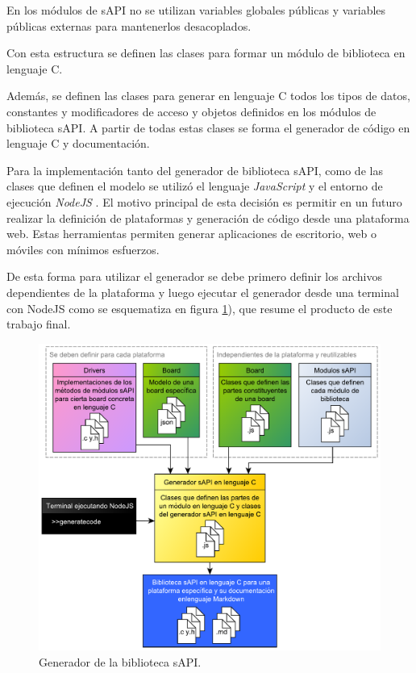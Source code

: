 En los módulos de sAPI no se utilizan variables globales públicas y variables públicas externas para mantenerlos desacoplados.

Con esta estructura se definen las clases para formar un módulo de biblioteca en lenguaje C.

Además, se definen las clases para generar en lenguaje C todos los tipos de datos, constantes y modificadores de acceso y objetos definidos en los módulos de biblioteca sAPI. A partir de todas estas clases se forma el generador de código en lenguaje C y documentación.

Para la implementación tanto del generador de biblioteca sAPI, como de las clases que definen el modelo se utilizó el lenguaje \emph{JavaScript} \citep{JavaScript} y el entorno de ejecución \emph{NodeJS} \citep{NodeJS}. El motivo principal de esta decisión es permitir en un futuro realizar la definición de plataformas y generación de código desde una plataforma web. Estas herramientas permiten generar aplicaciones de escritorio, web o móviles con mínimos esfuerzos.

De esta forma para utilizar el generador se debe primero definir los archivos dependientes de la plataforma y luego ejecutar el generador desde una terminal con NodeJS como se esquematiza en figura \ref{fig:fullSapiGen}), que resume el producto de este trabajo final.

\begin{figure}[!htbp]
\begin{center}  %
\includegraphics*[width=14.5cm]{Figures/sapi_gen2.pdf}
\par\caption{Generador de la biblioteca sAPI.}\label{fig:fullSapiGen}
\end{center}
\end{figure}


